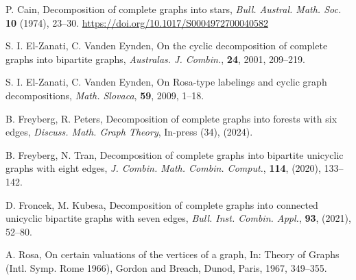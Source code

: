     \begin{thebibliography}{20}
    
    P. Cain, 
    Decomposition of complete graphs into stars, 
    \textit{Bull. Austral. Math. Soc.} \textbf{10} (1974), 23--30.
    \url{https://doi.org/10.1017/S0004972700040582}
    
    S. I. El-Zanati, C. Vanden Eynden,
    On the cyclic decomposition of complete graphs into bipartite graphs,
    \textit{Australas. J. Combin.}, \textbf{24}, 2001, 209--219.
    
    S. I. El-Zanati, C. Vanden Eynden,
    On Rosa-type labelings and cyclic graph decompositions,
    \textit{Math. Slovaca}, \textbf{59}, 2009, 1--18.
    
    B. Freyberg, R. Peters, 
    Decomposition of complete graphs into forests with six edges, 
    \textit{Discuss. Math. Graph Theory}, In-press (34), (2024).
    
    B. Freyberg, N. Tran, 
    Decomposition of complete graphs into bipartite unicyclic graphs with eight edges, 
    \textit{J. Combin. Math. Combin. Comput.}, \textbf{114}, (2020), 133--142.
    
    D. Froncek, M. Kubesa, 
    Decomposition of complete graphs into connected unicyclic bipartite graphs with seven edges,
    \textit{Bull. Inst. Combin. Appl.}, \textbf{93}, (2021), 52--80.
    
    A. Rosa,
    On certain valuations of the vertices of a graph,
    In: Theory of Graphs (Intl. Symp. Rome 1966), Gordon and Breach, Dunod, Paris,
    1967, 349--355.
    
    \end{thebibliography}